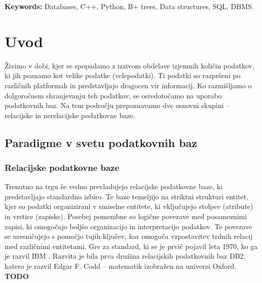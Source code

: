 \documentclass[a4paper,12pt,openright]{book}
\newcommand{\tkeywordsEn}{Databases, C++, Python, B+ trees, Data structures, SQL, DBMS}
\newcommand{\clearemptydoublepage}{\newpage{\pagestyle{empty}\cleardoublepage}}
\begin{document}
\noindent\textbf{Keywords:} \tkeywordsEn.
\clearemptydoublepage

\mainmatter
\setcounter{page}{1}
\pagestyle{fancy}


\chapter{Uvod}
    Živimo v dobi, kjer se spopadamo z izzivom obdelave izjemnih količin podatkov, ki jih poznamo kot velike podatke (velepodatki). Ti podatki so razpršeni po različnih platformah in predstavljajo dragocen vir informacij. Ko razmišljamo o dolgoročnem shranjevanju teh podatkov, se osredotočamo na uporabo podatkovnih baz. Na tem področju prepoznavamo dve osnovni skupini – relacijske in nerelacijske podatkovne baze.
    \section{Paradigme v svetu podatkovnih baz}
        \subsection{Relacijske podatkovne baze}
        Trenutno na trgu še vedno prevladujejo relacijske podatkovne baze, ki predstavljajo standardno izbiro. Te baze temeljijo na striktni strukturi entitet, kjer so podatki organizirani v smiselne entitete, ki vključujejo stolpce (atribute) in vrstice (zapiske). Posebej pomembne so logične povezave med posameznimi zapisi, ki omogočajo boljšo organizacijo in interpretacijo podatkov. Te povezave se uresničujejo s pomočjo tujih ključev, kar omogoča vzpostavitev trdnih relacij med različnimi entitetami.
        \newline
        \newline
        \noindent
        Gre za standard, ki se je prvič pojavil leta 1970, ko ga je razvil IBM \cite{IBM_DMBS_1970}. Razvita je bila prva družina relacijskih podatkovnih baz DB2, katero je razvil Edgar F. Codd – matematik izobražen na univerzi Oxford.
        \textbf{TODO}
        
\end{document}
